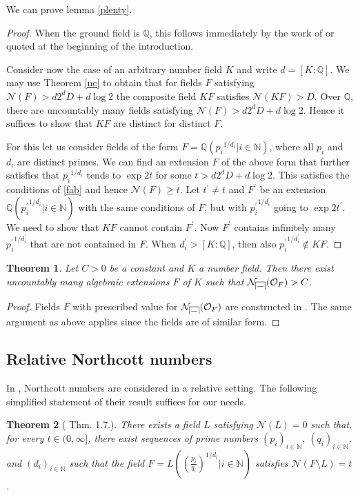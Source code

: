 \documentclass[11pt, a4paper, UKenglish]{amsart}
\renewcommand{\O}{\mathcal O}
\newcommand{\N}{\mathcal N}
\newcommand{\Q}{\mathbb{Q}}
\newcommand{\bbN}{\mathbb{N}}
\newcommand{\blank}{{-}}
\def\house#1{{%
    \setbox0=\hbox{$#1$}
    \vrule height \dimexpr\ht0+1.4pt width .4pt depth \dp0\relax
    \vrule height \dimexpr\ht0+1.4pt width \dimexpr\wd0+2pt depth \dimexpr-\ht0-1pt\relax
    \llap{$#1$\kern1pt}
    \vrule height \dimexpr\ht0+1.4pt width .4pt depth \dp0\relax
}}
\newtheorem{thm_}{Theorem}[section]
\theoremstyle{definition}
\newcommand{\thm}[1]{\begin{thm_}#1\end{thm_}}
\newcommand{\pf}[1]{\begin{proof}#1\end{proof}}
\begin{document}
We can prove lemma \ref{plenty}.

\fields*

\pf{When the ground field is $\Q$, this follows immediately by the work of \cite{oksa} or \cite{fab} quoted at the beginning of the introduction.

Consider now the case of an arbitrary number field $K$ and write $d = [K:\Q]$. We may use Theorem \ref{nc} to obtain that for fields $F$ satisfying $\N(F) > d2^dD+d\log 2$ the composite field $KF$ satisfies $\N(KF) > D$. Over $\Q$, there are uncountably many fields satisfying $\N(F) > d2^dD+d\log 2$. Hence it suffices to show that $KF$ are distinct for distinct $F$.

For this let us consider fields of the form $F = \Q({p_i}^{1/d_i}| i \in \bbN)$, where all $p_i$ and $d_i$ are distinct primes. We can find an extension $F$ of the above form that further satisfies that ${p_i}^{1/d_i}$ tends to $\exp{2t}$ for some $t > d2^dD+d\log 2$. This satisfies the conditions of \ref{fab} and hence $\N(F) \geq t$. Let $t^\prime \neq t$ and $F^\prime$ be an extension $\Q({p^\prime_i}^{1/d^\prime_i}| i \in \bbN)$ with the same conditions of $F$, but with ${p^\prime_i}^{1/d^\prime_i}$ going to $\exp{2t^\prime}$. We need to show that $KF$ cannot contain $F^\prime$. Now $F^\prime$ contains infinitely many ${p^\prime_i}^{1/d^\prime_i}$ that are not contained in $F$. When $d^\prime_i > [K:\Q]$, then also ${p^\prime_i}^{1/d^\prime_i} \notin KF$.
}

\thm{Let $C >0$ be a constant and $K$ a number field. Then there exist uncountably many algebraic extensions $F$ of $K$ such that $\N_{\house{\blank}}(\O_F) > C$.
}

\pf{Fields $F$ with prescribed value for $\N_{\house{\blank}}(\O_F)$ are constructed in \cite[Theorem 1]{fab}. The same argument as above applies since the fields are of similar form.}


\subsection{Relative Northcott numbers}

In \cite{okrelative}, Northcott numbers are considered in a relative setting. The following simplified statement of their result suffices for our needs.

\thm{[\cite{okrelative} Thm. 1.7.]There exists a field $L$ satisfying $\N(L)=0$ such that, for every $t\in(0,\infty]$, there exist sequences of prime numbers $(p_i)_{i \in \bbN}$, $(q_i)_{i \in \bbN}$, and $(d_i)_{i \in \bbN}$ such that the field $F = L((\frac{p_i}{q_i})^{1/d_i}| i \in \bbN)$ satisfies $\N(F\setminus L) = t$.}
\end{document}
